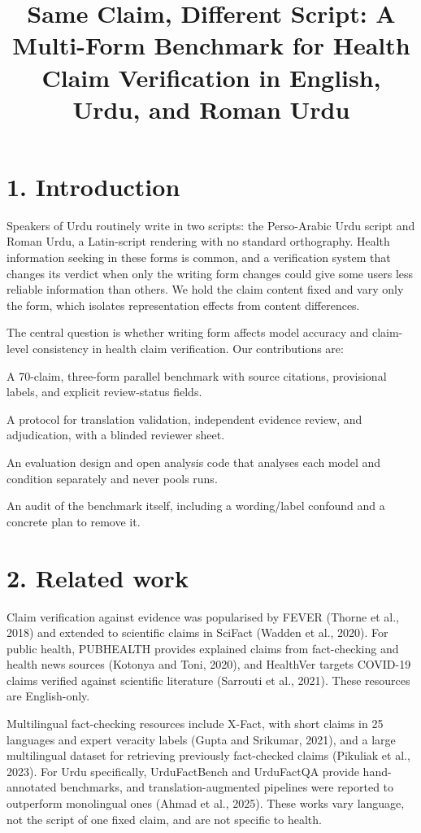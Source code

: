 \documentclass[10pt,a4paper]{article}
\title{Same Claim, Different Script: A Multi-Form Benchmark for Health Claim Verification in English, Urdu, and Roman Urdu}
\begin{document}
\maketitleabstract
\section{1. Introduction}
Speakers of Urdu routinely write in two scripts: the Perso-Arabic Urdu script and Roman Urdu, a Latin-script rendering with no standard orthography. Health information seeking in these forms is common, and a verification system that changes its verdict when only the writing form changes could give some users less reliable information than others. We hold the claim content fixed and vary only the form, which isolates representation effects from content differences.

The central question is whether writing form affects model accuracy and claim-level consistency in health claim verification. Our contributions are:

A 70-claim, three-form parallel benchmark with source citations, provisional labels, and explicit review-status fields.

A protocol for translation validation, independent evidence review, and adjudication, with a blinded reviewer sheet.

An evaluation design and open analysis code that analyses each model and condition separately and never pools runs.

An audit of the benchmark itself, including a wording/label confound and a concrete plan to remove it.

\section{2. Related work}
Claim verification against evidence was popularised by FEVER (Thorne et al., 2018) and extended to scientific claims in SciFact (Wadden et al., 2020). For public health, PUBHEALTH provides explained claims from fact-checking and health news sources (Kotonya and Toni, 2020), and HealthVer targets COVID-19 claims verified against scientific literature (Sarrouti et al., 2021). These resources are English-only.

Multilingual fact-checking resources include X-Fact, with short claims in 25 languages and expert veracity labels (Gupta and Srikumar, 2021), and a large multilingual dataset for retrieving previously fact-checked claims (Pikuliak et al., 2023). For Urdu specifically, UrduFactBench and UrduFactQA provide hand-annotated benchmarks, and translation-augmented pipelines were reported to outperform monolingual ones (Ahmad et al., 2025). These works vary language, not the script of one fixed claim, and are not specific to health.
\end{document}
